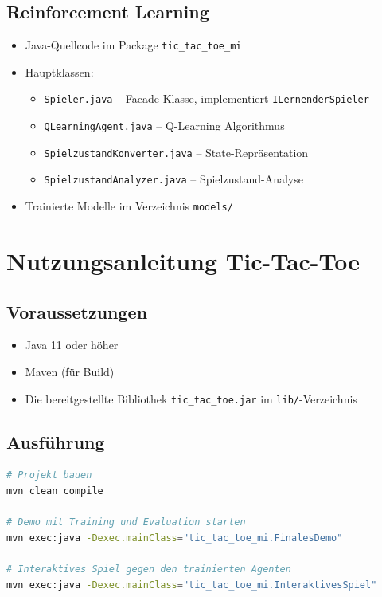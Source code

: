 \subsection{Reinforcement Learning}
\begin{itemize}
    \item Java-Quellcode im Package \texttt{tic\_tac\_toe\_mi}
    \item Hauptklassen:
    \begin{itemize}
        \item \texttt{Spieler.java} -- Facade-Klasse, implementiert \texttt{ILernenderSpieler}
        \item \texttt{QLearningAgent.java} -- Q-Learning Algorithmus
        \item \texttt{SpielzustandKonverter.java} -- State-Repräsentation
        \item \texttt{SpielzustandAnalyzer.java} -- Spielzustand-Analyse
    \end{itemize}
    \item Trainierte Modelle im Verzeichnis \texttt{models/}
\end{itemize}

\section{Nutzungsanleitung Tic-Tac-Toe}

\subsection{Voraussetzungen}
\begin{itemize}
    \item Java 11 oder höher
    \item Maven (für Build)
    \item Die bereitgestellte Bibliothek \texttt{tic\_tac\_toe.jar} im \texttt{lib/}-Verzeichnis
\end{itemize}

\subsection{Ausführung}
\begin{lstlisting}[language=bash, caption={Build und Ausführung}]
# Projekt bauen
mvn clean compile

# Demo mit Training und Evaluation starten
mvn exec:java -Dexec.mainClass="tic_tac_toe_mi.FinalesDemo"

# Interaktives Spiel gegen den trainierten Agenten
mvn exec:java -Dexec.mainClass="tic_tac_toe_mi.InteraktivesSpiel"
\end{lstlisting}

